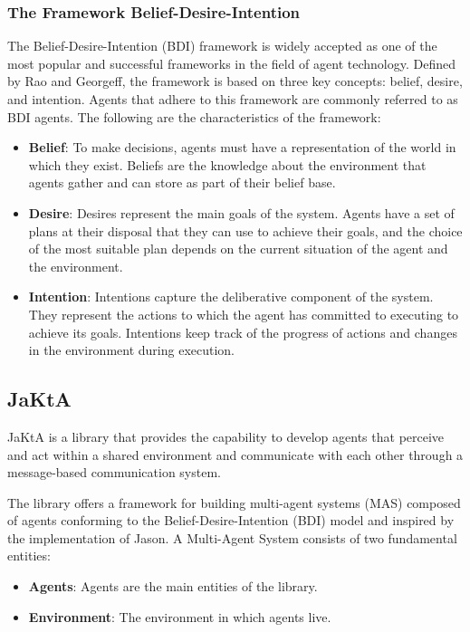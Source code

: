 \subsubsection{The Framework Belief-Desire-Intention}
The Belief-Desire-Intention (BDI) framework is widely accepted as one of the most popular and successful frameworks in the field of agent technology. Defined by Rao and Georgeff, the framework is based on three key concepts: belief, desire, and intention. Agents that adhere to this framework are commonly referred to as BDI agents.
The following are the characteristics of the framework:
\begin{itemize}
    \item \textbf{Belief}: To make decisions, agents must have a representation of the world in which they exist. Beliefs are the knowledge about the environment that agents gather and can store as part of their belief base.
    \item \textbf{Desire}: Desires represent the main goals of the system. Agents have a set of plans at their disposal that they can use to achieve their goals, and the choice of the most suitable plan depends on the current situation of the agent and the environment.
    \item \textbf{Intention}: Intentions capture the deliberative component of the system. They represent the actions to which the agent has committed to executing to achieve its goals. Intentions keep track of the progress of actions and changes in the environment during execution.
\end{itemize}

\subsection{JaKtA}
JaKtA\cite{10.1007/978-3-031-43264-4_4} is a library that provides the capability to develop agents that perceive and act within a shared environment and communicate with each other through a message-based communication system.

The library offers a framework for building multi-agent systems (MAS) composed of agents conforming to the Belief-Desire-Intention (BDI) model and inspired by the implementation of Jason\cite{Bordini2005}. A Multi-Agent System consists of two fundamental entities:

\begin{itemize}
    \item \textbf{Agents}: Agents are the main entities of the library.
    \item \textbf{Environment}: The environment in which agents live.
\end{itemize}

